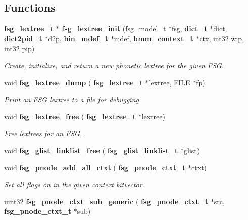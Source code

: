 \subsection*{Functions}
\begin{DoxyCompactItemize}
\item 
\mbox{\label{fsg__lextree_8c_a8c47b2983b3952886a4c889a711e1d65}} 
\textbf{ fsg\+\_\+lextree\+\_\+t} $\ast$ \textbf{ fsg\+\_\+lextree\+\_\+init} (fsg\+\_\+model\+\_\+t $\ast$fsg, \textbf{ dict\+\_\+t} $\ast$dict, \textbf{ dict2pid\+\_\+t} $\ast$d2p, \textbf{ bin\+\_\+mdef\+\_\+t} $\ast$mdef, \textbf{ hmm\+\_\+context\+\_\+t} $\ast$ctx, int32 wip, int32 pip)
\begin{DoxyCompactList}\small\item\em Create, initialize, and return a new phonetic lextree for the given F\+SG. \end{DoxyCompactList}\item 
\mbox{\label{fsg__lextree_8c_a5c267f09b8dc214dd7deb41232d84726}} 
void \textbf{ fsg\+\_\+lextree\+\_\+dump} (\textbf{ fsg\+\_\+lextree\+\_\+t} $\ast$lextree, F\+I\+LE $\ast$fp)
\begin{DoxyCompactList}\small\item\em Print an F\+SG lextree to a file for debugging. \end{DoxyCompactList}\item 
\mbox{\label{fsg__lextree_8c_a2f1ab965df1214f4d0e2008833aa20da}} 
void \textbf{ fsg\+\_\+lextree\+\_\+free} (\textbf{ fsg\+\_\+lextree\+\_\+t} $\ast$lextree)
\begin{DoxyCompactList}\small\item\em Free lextrees for an F\+SG. \end{DoxyCompactList}\item 
\mbox{\label{fsg__lextree_8c_a3931da8d9c5b2709c58755d5f15faaf5}} 
void {\bfseries fsg\+\_\+glist\+\_\+linklist\+\_\+free} (\textbf{ fsg\+\_\+glist\+\_\+linklist\+\_\+t} $\ast$glist)
\item 
\mbox{\label{fsg__lextree_8c_a98fd94d024df264025e30c909c82cb56}} 
void \textbf{ fsg\+\_\+pnode\+\_\+add\+\_\+all\+\_\+ctxt} (\textbf{ fsg\+\_\+pnode\+\_\+ctxt\+\_\+t} $\ast$ctxt)
\begin{DoxyCompactList}\small\item\em Set all flags on in the given context bitvector. \end{DoxyCompactList}\item 
\mbox{\label{fsg__lextree_8c_aa9ff81fb4f5d873188fcf3be3f5fc18e}} 
uint32 \textbf{ fsg\+\_\+pnode\+\_\+ctxt\+\_\+sub\+\_\+generic} (\textbf{ fsg\+\_\+pnode\+\_\+ctxt\+\_\+t} $\ast$src, \textbf{ fsg\+\_\+pnode\+\_\+ctxt\+\_\+t} $\ast$sub)

\end{DoxyCompactItemize}
